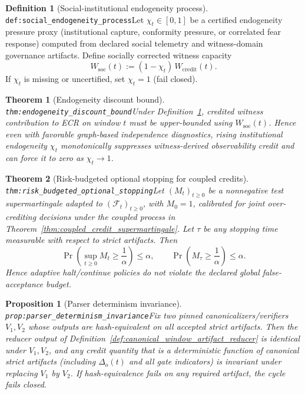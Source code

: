 \documentclass[11pt]{article}
\theoremstyle{definition}
\newtheorem{definition}{Definition}
\theoremstyle{plain}
\newtheorem{proposition}{Proposition}
\newtheorem{theorem}{Theorem}
\newcommand{\lbl}[1]{\texttt{\footnotesize\nolinkurl{#1}}}
\newcommand{\DefLabel}[1]{\hfill{\small\lbl{#1}}}
\newcommand{\Filtration}{(\mathcal{F}_t)_{t\ge 0}}
\newcommand{\deltao}{\Delta_o}
\begin{document}
\begin{definition}[Social-institutional endogeneity process]\DefLabel{def:social_endogeneity_process}\label{def:social_endogeneity_process}
Let $\chi_t\in[0,1]$ be a certified endogeneity pressure proxy (institutional capture, conformity pressure, or correlated fear response) computed from declared social telemetry and witness-domain governance artifacts.
Define socially corrected witness capacity
\[
W_{\mathrm{soc}}(t):=(1-\chi_t)\,W_{\mathrm{credit}}(t).
\]
If $\chi_t$ is missing or uncertified, set $\chi_t=1$ (fail closed).
\end{definition}

\begin{theorem}[Endogeneity discount bound]\DefLabel{thm:endogeneity_discount_bound}\label{thm:endogeneity_discount_bound}
Under Definition~\ref{def:social_endogeneity_process}, credited witness contribution to ECR on window $t$ must be upper-bounded using $W_{\mathrm{soc}}(t)$.
Hence even with favorable graph-based independence diagnostics, rising institutional endogeneity $\chi_t$ monotonically suppresses witness-derived observability credit and can force it to zero as $\chi_t\to 1$.
\end{theorem}

\begin{theorem}[Risk-budgeted optional stopping for coupled credits]\DefLabel{thm:risk_budgeted_optional_stopping}\label{thm:risk_budgeted_optional_stopping}
Let $(M_t)_{t\ge 0}$ be a nonnegative test supermartingale adapted to $\Filtration$, with $M_0=1$, calibrated for joint over-crediting decisions under the coupled process in Theorem~\ref{thm:coupled_credit_supermartingale}.
Let $\tau$ be any stopping time measurable with respect to strict artifacts.
Then
\[
\Pr\!\left(\sup_{t\ge 0} M_t\ge \frac{1}{\alpha}\right)\le \alpha,\qquad
\Pr\!\left(M_{\tau}\ge \frac{1}{\alpha}\right)\le \alpha.
\]
Hence adaptive halt/continue policies do not violate the declared global false-acceptance budget.
\end{theorem}

\begin{proposition}[Parser determinism invariance]\DefLabel{prop:parser_determinism_invariance}\label{prop:parser_determinism_invariance}
Fix two pinned canonicalizers/verifiers $V_1,V_2$ whose outputs are hash-equivalent on all accepted strict artifacts.
Then the reducer output of Definition~\ref{def:canonical_window_artifact_reducer} is identical under $V_1,V_2$, and any credit quantity that is a deterministic function of canonical strict artifacts (including $\deltao(t)$ and all gate indicators) is invariant under replacing $V_1$ by $V_2$.
If hash-equivalence fails on any required artifact, the cycle fails closed.
\end{proposition}
\end{document}
